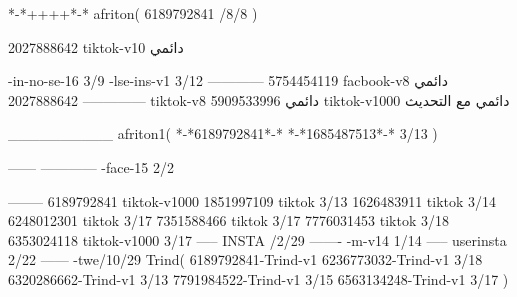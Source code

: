 *-*++++*-*
afriton(
6189792841 /8/8
)

2027888642 tiktok-v10
دائمي

-in-no-se-16 3/9
-lse-ins-v1 3/12
------------
5754454119 facbook-v8
دائمي
--------------
2027888642 tiktok-v8
دائمي
5909533996 tiktok-v1000
دائمي مع التحديث

__________
afriton1(
*-*6189792841*-*
*-*1685487513*-* 3/13
)


------
------------
-face-15 2/2

--------
6189792841 tiktok-v1000
1851997109 tiktok 3/13
1626483911 tiktok 3/14
6248012301 tiktok 3/17
7351588466 tiktok 3/17
7776031453 tiktok 3/18
6353024118 tiktok-v1000 3/17
-----
 INSTA /2/29
-------
-m-v14 1/14
-----
userinsta 2/22
------
-twe/10/29
Trind(
6189792841-Trind-v1 
6236773032-Trind-v1 3/18
6320286662-Trind-v1 3/13
7791984522-Trind-v1 3/15
6563134248-Trind-v1 3/17
)
